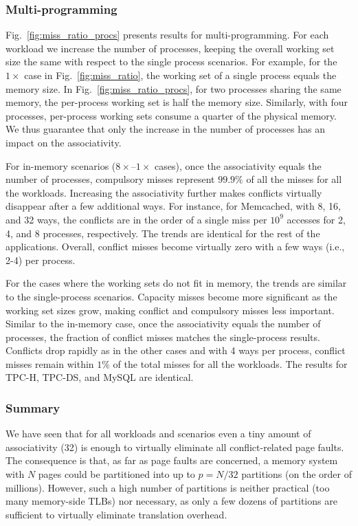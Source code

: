 \subsubsection{Multi-programming}
Fig.~\ref{fig:miss_ratio_procs} presents results for multi-programming. For each workload we increase the number of processes, keeping the overall working set size the same with respect to the single process scenarios. For example, for the $1\times$ case in Fig.~\ref{fig:miss_ratio}, the working set of a single process equals the memory size. In Fig.~\ref{fig:miss_ratio_procs}, for two processes sharing the same memory, the per-process working set is half the memory size. Similarly, with four processes, per-process working sets consume a quarter of the physical memory. We thus guarantee that only the increase in the number of processes has an impact on the associativity. 

For in-memory scenarios ($8\times$--$1\times$ cases), once the associativity equals the number of processes, compulsory misses represent $99.9\%$ of all the misses for all the workloads. Increasing the associativity further makes conflicts virtually disappear after a few additional ways. For instance, for Memcached, with 8, 16, and 32 ways, the conflicts are in the order of a single miss per $10^{9}$ accesses for 2, 4, and 8 processes, respectively. The trends are identical for the rest of the applications. Overall, conflict misses become virtually zero with a few ways (i.e., 2-4) per process.

For the cases where the working sets do not fit in memory, the trends are similar to the single-process scenarios. Capacity misses become more significant as the working set sizes grow, making conflict and compulsory misses less important. Similar to the in-memory case, once the associativity equals the number of processes, the fraction of conflict misses matches the single-process results. Conflicts drop rapidly as in the other cases and with 4 ways per process, conflict misses remain within $1\%$ of the total misses for all the workloads. The results for TPC-H, TPC-DS, and MySQL are identical.

\subsubsection{Summary}
We have seen that for all workloads and scenarios even a tiny amount of associativity (32) is enough to virtually eliminate all conflict-related page faults. The consequence is that, as far as page faults are concerned, a memory system with $N$ pages could be partitioned into up to $p=N/32$ partitions (on the order of millions). However, such a high number of partitions is neither practical (too many memory-side TLBs) nor necessary, as only a few dozens of partitions are sufficient to virtually eliminate translation overhead. 


